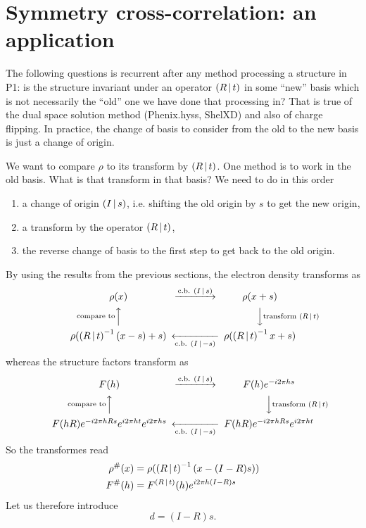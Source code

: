 \documentclass[11pt]{article}
\begin{document}
\section{Symmetry cross-correlation: an application}

The following questions is recurrent after any method processing a structure in P1: is the structure invariant under an operator $\left( R\,\vert\, t \right)$ in some ``new'' basis which is not necessarily the ``old'' one we have done that processing in? That is true of the dual space solution method (Phenix.hyss, ShelXD) and also of charge flipping. In practice, the change of basis to consider from the old to the new basis is just a change of origin.

We want to compare $\rho$ to its transform by $\left( R\,\vert\, t \right)$. One method is to work in the old basis. What is that transform in that basis? We need to do in this order
\begin{enumerate}
\item a change of origin $\left( I\,\vert\, s \right)$, i.e. shifting the old origin by $s$ to get the new origin,
\item a transform by the operator $\left( R\,\vert\, t \right)$,
\item the reverse change of basis to the first step to get back to the old origin.
\end{enumerate}
By using the results from the previous sections, the electron density transforms as
\begin{equation*}
\begin{CD}
\rho(x)                                  @>{\text{c.b. } \sym{I}{s}}>>   \rho(x+s)                               \\
@A{\text{compare to}}AA                                      @VV{\text{transform } \sym{R}{t}}V         \\
\rho(\sym{R}{t}^{-1}(x-s) + s)   @<<{\text{c.b. } \sym{I}{-s}}< \rho(\sym{R}{t}^{-1}x + s)
\end{CD}
\end{equation*}
whereas the structure factors transform as
\begin{equation*}
\begin{CD}
F(h)                                  @>{\text{c.b. } \sym{I}{s}}>>   F(h)e^{-i2\pi hs}            \\
@A{\text{compare to}}AA                                      @VV{\text{transform } \sym{R}{t}}V    \\
F(hR)e^{-i2\pi hRs}e^{i2\pi ht}e^{i2\pi hs}   @<<{\text{c.b. } \sym{I}{-s}}< F(hR)e^{-i2\pi hRs}e^{i2\pi ht}
\end{CD}
\end{equation*}
So the transformes read
\begin{align}
\rho^\#(x) &= \rho(\left( R\,\vert\, t \right)^{-1}(x - (I-R)s))\\
F^\#(h) &= F^{\left( R\,\vert\, t \right)}(h) e^{i2\pi h(I-R)s} \label{eqn:translation::search::F}
\end{align}
Let us therefore introduce
\begin{equation}
d = (I-R)s. \label{eqn:def::d}
\end{equation}
\end{document}
